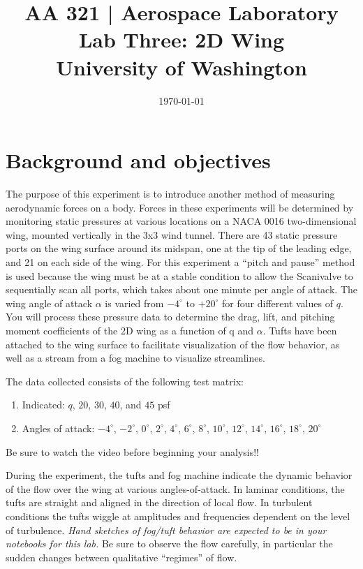 \documentclass[12pt]{article}
\begin{document}
\title{\Large {\bf AA 321 | Aerospace Laboratory\\Lab Three: 2D Wing}\\[1ex]
  University of Washington}
\date{\today}
\maketitle

\section{Background and objectives}\label{objs}
The purpose of this experiment is to introduce another method of measuring aerodynamic forces on a body. Forces in these experiments will be determined by monitoring static pressures at various locations on a NACA 0016 two-dimensional wing, mounted vertically in the 3x3 wind tunnel. There are 43 static pressure ports on the wing surface around its midspan, one at the tip of the leading edge, and 21 on each side of the wing. For this experiment a ``pitch and pause'' method is used because the wing must be at a stable condition to allow the Scanivalve to sequentially scan all ports, which takes about one minute per angle of attack. The wing angle of attack $\alpha$ is varied from $-4^\circ$ to $+20^\circ$ for four different values of $q$. You will process these pressure data to determine the drag, lift, and pitching moment coefficients of the 2D wing as a function of q and $\alpha$. Tufts have been attached to the wing surface to facilitate visualization of the flow behavior, as well as a stream from a fog machine to visualize streamlines.

The data collected consists of the following test matrix:
\begin{enumerate}[noitemsep]
\item Indicated: $q$, $20$, $30$, $40$, and $45$ psf
\item Angles of attack: $-4^\circ$, $-2^\circ$, $0^\circ$, $2^\circ$, $4^\circ$, $6^\circ$, $8^\circ$, $10^\circ$, $12^\circ$, $14^\circ$, $16^\circ$, $18^\circ$, $20^\circ$
\end{enumerate}
Be sure to watch the video before beginning your analysis!!

During the experiment, the tufts and fog machine indicate the dynamic behavior of the flow over the wing at various angles-of-attack. In laminar conditions, the tufts are straight and aligned in the direction of local flow. In turbulent conditions the tufts wiggle at amplitudes and frequencies dependent on the level of turbulence. \textit{Hand sketches of fog/tuft behavior are expected to be in your notebooks for this lab.} Be sure to observe the flow carefully, in particular the sudden changes between qualitative ``regimes'' of flow.
\end{document}
